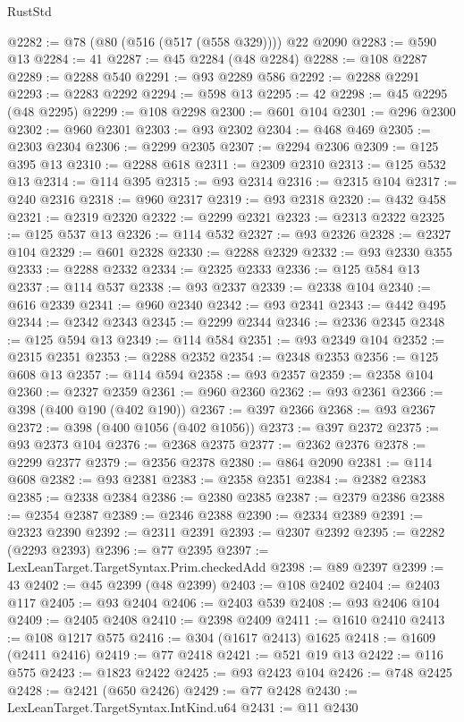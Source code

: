 \begin{lexlean}{RustStd}
\begin{coremodule}
@2282 := @78 (@80 (@516 (@517 (@558 @329)))) @22 @2090
@2283 := @590 @13
@2284 := 41
@2287 := @45 @2284 (@48 @2284)
@2288 := @108 @2287
@2289 := @2288 @540
@2291 := @93 @2289 @586
@2292 := @2288 @2291
@2293 := @2283 @2292
@2294 := @598 @13
@2295 := 42
@2298 := @45 @2295 (@48 @2295)
@2299 := @108 @2298
@2300 := @601 @104
@2301 := @296 @2300
@2302 := @960 @2301
@2303 := @93 @2302
@2304 := @468 @469
@2305 := @2303 @2304
@2306 := @2299 @2305
@2307 := @2294 @2306
@2309 := @125 @395 @13
@2310 := @2288 @618
@2311 := @2309 @2310
@2313 := @125 @532 @13
@2314 := @114 @395
@2315 := @93 @2314
@2316 := @2315 @104
@2317 := @240 @2316
@2318 := @960 @2317
@2319 := @93 @2318
@2320 := @432 @458
@2321 := @2319 @2320
@2322 := @2299 @2321
@2323 := @2313 @2322
@2325 := @125 @537 @13
@2326 := @114 @532
@2327 := @93 @2326
@2328 := @2327 @104
@2329 := @601 @2328
@2330 := @2288 @2329
@2332 := @93 @2330 @355
@2333 := @2288 @2332
@2334 := @2325 @2333
@2336 := @125 @584 @13
@2337 := @114 @537
@2338 := @93 @2337
@2339 := @2338 @104
@2340 := @616 @2339
@2341 := @960 @2340
@2342 := @93 @2341
@2343 := @442 @495
@2344 := @2342 @2343
@2345 := @2299 @2344
@2346 := @2336 @2345
@2348 := @125 @594 @13
@2349 := @114 @584
@2351 := @93 @2349 @104
@2352 := @2315 @2351
@2353 := @2288 @2352
@2354 := @2348 @2353
@2356 := @125 @608 @13
@2357 := @114 @594
@2358 := @93 @2357
@2359 := @2358 @104
@2360 := @2327 @2359
@2361 := @960 @2360
@2362 := @93 @2361
@2366 := @398 (@400 @190 (@402 @190))
@2367 := @397 @2366
@2368 := @93 @2367
@2372 := @398 (@400 @1056 (@402 @1056))
@2373 := @397 @2372
@2375 := @93 @2373 @104
@2376 := @2368 @2375
@2377 := @2362 @2376
@2378 := @2299 @2377
@2379 := @2356 @2378
@2380 := @864 @2090
@2381 := @114 @608
@2382 := @93 @2381
@2383 := @2358 @2351
@2384 := @2382 @2383
@2385 := @2338 @2384
@2386 := @2380 @2385
@2387 := @2379 @2386
@2388 := @2354 @2387
@2389 := @2346 @2388
@2390 := @2334 @2389
@2391 := @2323 @2390
@2392 := @2311 @2391
@2393 := @2307 @2392
@2395 := @2282 (@2293 @2393)
@2396 := @77 @2395
@2397 := LexLeanTarget.TargetSyntax.Prim.checkedAdd
@2398 := @89 @2397
@2399 := 43
@2402 := @45 @2399 (@48 @2399)
@2403 := @108 @2402
@2404 := @2403 @117
@2405 := @93 @2404
@2406 := @2403 @539
@2408 := @93 @2406 @104
@2409 := @2405 @2408
@2410 := @2398 @2409
@2411 := @1610 @2410
@2413 := @108 @1217 @575
@2416 := @304 (@1617 @2413) @1625
@2418 := @1609 (@2411 @2416)
@2419 := @77 @2418
@2421 := @521 @19 @13
@2422 := @116 @575
@2423 := @1823 @2422
@2425 := @93 @2423 @104
@2426 := @748 @2425
@2428 := @2421 (@650 @2426)
@2429 := @77 @2428
@2430 := LexLeanTarget.TargetSyntax.IntKind.u64
@2431 := @11 @2430

\end{coremodule}
\end{lexlean}
